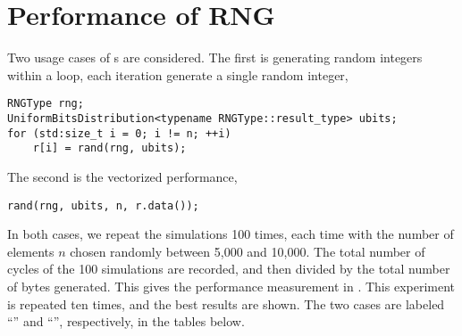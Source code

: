 %
%
%
%

\chapter{Performance of RNG}
\label{chap:Performance of RNG}

\system

\compilerthree

Two usage cases of \rng{}s are considered. The first is generating random
integers within a loop, each iteration generate a single random integer,
\begin{verbatim}
RNGType rng;
UniformBitsDistribution<typename RNGType::result_type> ubits;
for (std:size_t i = 0; i != n; ++i)
    r[i] = rand(rng, ubits);
\end{verbatim}
The second is the vectorized performance,
\begin{verbatim}
rand(rng, ubits, n, r.data());
\end{verbatim}
In both cases, we repeat the simulations 100 times, each time with the number
of elements $n$ chosen randomly between 5,000 and 10,000. The total number of
cycles of the 100 simulations are recorded, and then divided by the total
number of bytes generated. This gives the performance measurement in \cpb. This
experiment is repeated ten times, and the best results are shown. The two cases
are labeled ``\single'' and ``\batch'', respectively, in the tables below.

